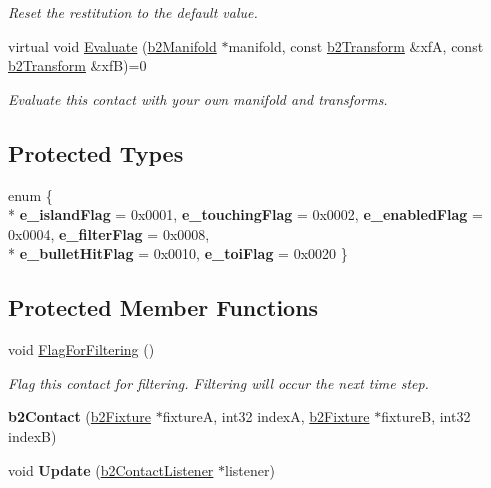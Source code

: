 \begin{DoxyCompactItemize}
\begin{DoxyCompactList}\small\item\em Reset the restitution to the default value. \end{DoxyCompactList}\item 
\hypertarget{classb2_contact_ae3c2842e5325b2d4500f8ed1d4de2f72}{virtual void \hyperlink{classb2_contact_ae3c2842e5325b2d4500f8ed1d4de2f72}{Evaluate} (\hyperlink{structb2_manifold}{b2\-Manifold} $\ast$manifold, const \hyperlink{structb2_transform}{b2\-Transform} \&xf\-A, const \hyperlink{structb2_transform}{b2\-Transform} \&xf\-B)=0}\label{classb2_contact_ae3c2842e5325b2d4500f8ed1d4de2f72}

\begin{DoxyCompactList}\small\item\em Evaluate this contact with your own manifold and transforms. \end{DoxyCompactList}\end{DoxyCompactItemize}
\subsection*{Protected Types}
\begin{DoxyCompactItemize}
\item 
enum \{ \\*
{\bfseries e\-\_\-island\-Flag} =  0x0001, 
{\bfseries e\-\_\-touching\-Flag} =  0x0002, 
{\bfseries e\-\_\-enabled\-Flag} =  0x0004, 
{\bfseries e\-\_\-filter\-Flag} =  0x0008, 
\\*
{\bfseries e\-\_\-bullet\-Hit\-Flag} =  0x0010, 
{\bfseries e\-\_\-toi\-Flag} =  0x0020
 \}
\end{DoxyCompactItemize}
\subsection*{Protected Member Functions}
\begin{DoxyCompactItemize}
\item 
\hypertarget{classb2_contact_a44a3d32149021269eb9dfd4015c98e0d}{void \hyperlink{classb2_contact_a44a3d32149021269eb9dfd4015c98e0d}{Flag\-For\-Filtering} ()}\label{classb2_contact_a44a3d32149021269eb9dfd4015c98e0d}

\begin{DoxyCompactList}\small\item\em Flag this contact for filtering. Filtering will occur the next time step. \end{DoxyCompactList}\item 
\hypertarget{classb2_contact_a2d1c98399cef1eb95c6ee8aad8257f60}{{\bfseries b2\-Contact} (\hyperlink{classb2_fixture}{b2\-Fixture} $\ast$fixture\-A, int32 index\-A, \hyperlink{classb2_fixture}{b2\-Fixture} $\ast$fixture\-B, int32 index\-B)}\label{classb2_contact_a2d1c98399cef1eb95c6ee8aad8257f60}

\item 
\hypertarget{classb2_contact_a218a66a6c34e3de1c428aa73a0680dfe}{void {\bfseries Update} (\hyperlink{classb2_contact_listener}{b2\-Contact\-Listener} $\ast$listener)}\label{classb2_contact_a218a66a6c34e3de1c428aa73a0680dfe}

\end{DoxyCompactItemize}
